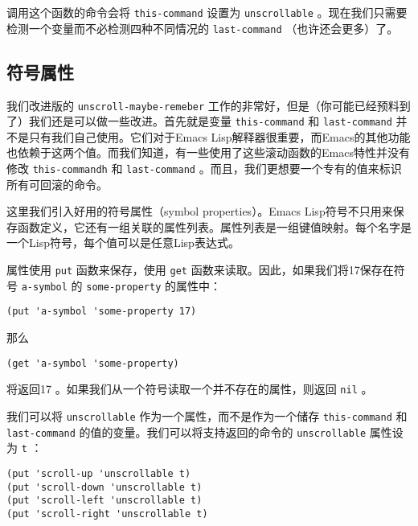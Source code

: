 调用这个函数的命令会将 \texttt{this-command} 设置为 \texttt{unscrollable} 。现在我们只需要检测一个变量而不必检测四种不同情况的 \texttt{last-command} （也许还会更多）了。

\subsection{符号属性}
\label{section:03-Symbol-Properties}

我们改进版的 \texttt{unscroll-maybe-remeber} 工作的非常好，但是（你可能已经预料到了）我们还是可以做一些改进。首先就是变量 \texttt{this-command} 和 \texttt{last-command} 并不是只有我们自己使用。它们对于Emacs Lisp解释器很重要，而Emacs的其他功能也依赖于这两个值。而我们知道，有一些使用了这些滚动函数的Emacs特性并没有修改 \texttt{this-commandh} 和 \texttt{last-command} 。而且，我们更想要一个专有的值来标识所有可回滚的命令。

这里我们引入好用的符号属性（symbol properties）。Emacs Lisp符号不只用来保存函数定义，它还有一组关联的属性列表。属性列表是一组键值映射。每个名字是一个Lisp符号，每个值可以是任意Lisp表达式。

属性使用 \texttt{put} 函数来保存，使用 \texttt{get} 函数来读取。因此，如果我们将17保存在符号 \texttt{a-symbol} 的 \texttt{some-property} 的属性中：

\begin{verbatim}
(put 'a-symbol 'some-property 17)
\end{verbatim}

那么

\begin{verbatim}
(get 'a-symbol 'some-property)
\end{verbatim}

将返回17 。如果我们从一个符号读取一个并不存在的属性，则返回 \texttt{nil} 。

我们可以将 \texttt{unscrollable} 作为一个属性，而不是作为一个储存 \texttt{this-command} 和 \texttt{last-command} 的值的变量。我们可以将支持返回的命令的 \texttt{unscrollable} 属性设为 \texttt{t} ：

\begin{verbatim}
(put 'scroll-up 'unscrollable t)
(put 'scroll-down 'unscrollable t)
(put 'scroll-left 'unscrollable t)
(put 'scroll-right 'unscrollable t)
\end{verbatim}

